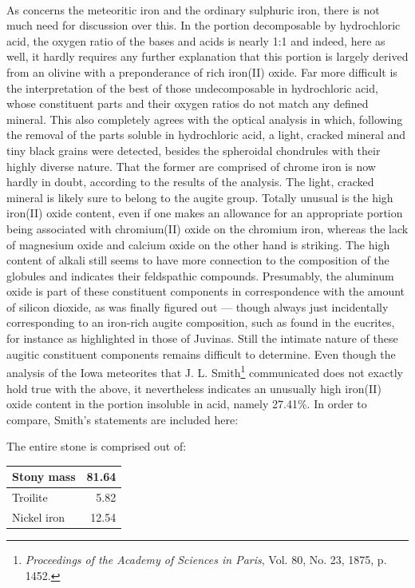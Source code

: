 \documentclass[a4paper, 12pt, oneside]{article}
\begin{document}
\paragraph*{}
As concerns the meteoritic iron and the ordinary sulphuric iron, there is not much need for discussion over this. In the portion decomposable by hydrochloric acid, the oxygen ratio of the bases and acids is nearly 1:1 and indeed, here as well, it hardly requires any further explanation that this portion is largely derived from an olivine with a preponderance of rich iron(II) oxide. Far more difficult is the interpretation of the best of those undecomposable in hydrochloric acid, whose constituent parts and their oxygen ratios do not match any defined mineral. This also completely agrees with the optical analysis in which, following the removal of the parts soluble in hydrochloric acid, a light, cracked mineral and tiny black grains were detected, besides the spheroidal chondrules with their highly diverse nature. That the former are comprised of chrome iron is now hardly in doubt, according to the results of the analysis. The light, cracked mineral is likely sure to belong to the augite group. Totally unusual is the high iron(II) oxide content, even if one makes an allowance for an appropriate portion being associated with chromium(II) oxide on the chromium iron, whereas the lack of magnesium oxide and calcium oxide on the other hand is striking. The high content of alkali still seems to have more connection to the composition of the globules and indicates their feldspathic compounds. Presumably, the aluminum oxide is part of these constituent components in correspondence with the amount of silicon dioxide, as was finally figured out --- though always just incidentally corresponding to an iron-rich augite composition, such as found in the eucrites, for instance as highlighted in those of Juvinas. Still the intimate nature of these augitic constituent components remains difficult to determine. Even though the analysis of the Iowa meteorites that J. L. Smith\footnote{\emph{Proceedings of the Academy of Sciences in Paris}, Vol. 80, No. 23, 1875, p. 1452.} communicated does not exactly hold true with the above, it nevertheless indicates an unusually high iron(II) oxide content in the portion insoluble in acid, namely 27.41\%. In order to compare, Smith's statements are included here:

The entire stone is comprised out of:
\begin{center}
    \begin{tabular}{ |l|r| } 
    \hline
    Stony mass & 81.64\\\hline
    Troilite & 5.82\\\hline
    Nickel iron & 12.54\\
    \hline
    \end{tabular}
\end{center}
\end{document}

